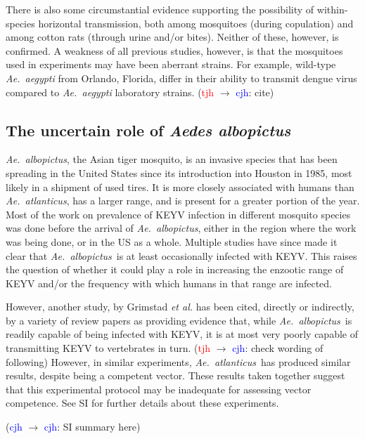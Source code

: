 \documentclass[12pt]{article}
\newcommand{\alb}{\textit{Ae.\ albopictus}}
\newcommand{\atl}{\textit{Ae.\ atlanticus}}
\newcommand{\cjh}{\textcolor{blue}{cjh}}
\newcommand{\tjh}{\textcolor{red}{tjh}}
\newcommand{\msg}[3]{(#1 $\rightarrow$ #2: #3)}
\newcommand{\mcc}[1]{\msg\cjh\cjh{#1}}
\newcommand{\mtc}[1]{\msg\tjh\cjh{#1}}
\begin{document}
            There is also some circumstantial evidence supporting the possibility of within-species horizontal transmission, both among mosquitoes (during copulation)\cite{asdf} and among cotton rats (through urine and/or bites)\cite{taylor1971california}. Neither of these, however, is confirmed. A weakness of all previous studies, however, is that the mosquitoes used in experiments may have been aberrant strains.  For example, wild-type \emph{Ae.\ aegypti} from Orlando, Florida, differ in their ability to transmit dengue virus compared to \emph{Ae.\ aegypti} laboratory strains. \mtc{cite}

        \subsection{The uncertain role of \textit{Aedes albopictus}}
            \label{albopictus}
            \alb, the Asian tiger mosquito, is an invasive species that has been spreading in the United States since its introduction into Houston in 1985, most likely in a shipment of used tires. It is more closely associated with humans than \atl, has a larger range, and is present for a greater portion of the year. Most of the work on prevalence of KEYV infection in different mosquito species was done before the arrival of \alb, either in the region where the work was being done, or in the US as a whole. Multiple studies have since made it clear that \alb\ is at least occasionally infected with KEYV. This raises the question of whether it could play a role in increasing the enzootic range of KEYV and/or the frequency with which humans in that range are infected.

            However, another study, by Grimstad \textit{et al.} \cite{grimstad1989recently} has been cited, directly or indirectly, by a variety of review papers\cite{asdf,asdf} as providing evidence that, while \alb\ is readily capable of being infected with KEYV, it is at most very poorly capable of transmitting KEYV to vertebrates in turn. \mtc{ check wording of following} However, in similar experiments, \atl\ has produced similar results, despite being a competent vector.  These results taken together suggest that this experimental protocol may be inadequate for assessing vector competence.  See SI for further details about these experiments.
            
        \mcc{SI summary here}
\end{document}
